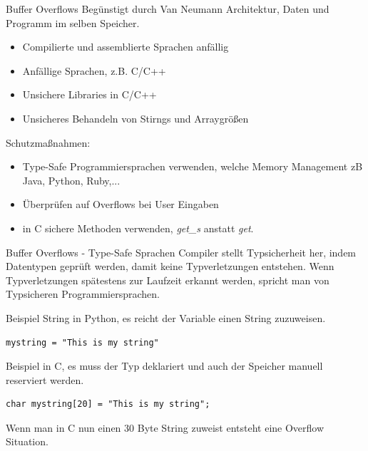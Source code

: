 \documentclass[10pt]{beamer}
\begin{document}
\begin{frame}[fragile]{Buffer Overflows}
  Beg\"unstigt durch Van Neumann Architektur, Daten und Programm im selben Speicher.
  \begin{itemize}
    \item Compilierte und assemblierte Sprachen anf\"allig
    \item Anf\"allige Sprachen, z.B. C/C++
    \item Unsichere Libraries in C/C++
    \item Unsicheres Behandeln von Stirngs und Arraygr\"o{\ss}en
  \end{itemize}

  Schutzma{\ss}nahmen:
  \begin{itemize}
    \item Type-Safe Programmiersprachen verwenden, welche Memory Management zB Java, Python, Ruby,...
    \item \"Uberpr\"ufen auf Overflows bei User Eingaben
    \item in C sichere Methoden verwenden, \textit{get\_s} anstatt \textit{get}.
  \end{itemize}
\end{frame}

\begin{frame}[fragile]{Buffer Overflows - Type-Safe Sprachen}
  Compiler stellt Typsicherheit her, indem Datentypen gepr\"uft werden, damit keine Typverletzungen entstehen.
  Wenn Typverletzungen sp\"atestens zur Laufzeit erkannt werden, spricht man von Typsicheren Programmiersprachen.

  Beispiel String in Python, es reicht der Variable einen String zuzuweisen.
  \begin{lstlisting}[style=CStyle]
    mystring = "This is my string"
  \end{lstlisting}

  Beispiel in C, es muss der Typ deklariert und auch der Speicher manuell reserviert werden.
  \begin{lstlisting}[style=CStyle]
    char mystring[20] = "This is my string";
  \end{lstlisting}
  Wenn man in C nun einen 30 Byte String zuweist entsteht eine Overflow Situation.
\end{frame}
\end{document}
